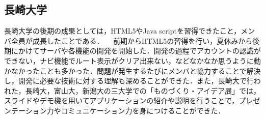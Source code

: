 \subsection{長崎大学}
長崎大学の後期の成果としては，HTML5やJava scriptを習得できたこと，メンバ全員が成長したことである．
　前期からHTML5の習得を行い，夏休みから後期にかけてサーバや各機能の開発を開始した．開発の過程でアカウントの認識ができない，ナビ機能でルート表示がクリア出来ない，などなかなか思うように動かなかったことも多かった．問題が発生するたびにメンバと協力することで解決し，開発に必要な技術に対する理解も深めることができた．また，長崎大で行われた，長崎大，富山大，新潟大の三大学での「ものづくり・アイデア展」では，スライドやデモ機を用いてアプリケーションの紹介や説明を行うことで，プレゼンテーション力やコミュニケーション力を身につけることができた．
